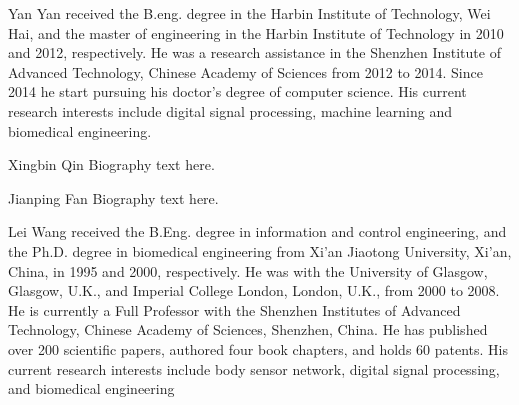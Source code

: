 \documentclass[journal]{IEEEtran}
\begin{document}
  
  

% 

\begin{IEEEbiography}{Yan Yan}
received the B.eng. degree in the Harbin Institute of Technology, Wei Hai, and the master of engineering in the Harbin Institute of Technology in 2010 and 2012, respectively. He was a research assistance in the Shenzhen Institute of Advanced Technology, Chinese Academy of Sciences from 2012 to 2014. Since 2014 he start pursuing his doctor's degree of computer science. His current research interests include digital signal processing, machine learning and biomedical engineering.
\end{IEEEbiography} 

\begin{IEEEbiography}{Xingbin Qin}
Biography text here.
\end{IEEEbiography}

\begin{IEEEbiography}{Jianping Fan}
Biography text here.
\end{IEEEbiography}
\begin{IEEEbiography}{Lei Wang}
received the B.Eng. degree in information and control engineering, and the Ph.D. degree in biomedical engineering from Xi’an Jiaotong University, Xi’an, China, in 1995 and 2000, respectively. He was with the University of Glasgow, Glasgow, U.K., and Imperial College London, London, U.K., from 2000 to 2008. He is currently a Full Professor with the Shenzhen Institutes of Advanced Technology, Chinese Academy of Sciences, Shenzhen, China. He has published over 200 scientific papers, authored four book chapters, and holds 60 patents. His current research interests include body sensor network, digital signal processing, and biomedical engineering
\end{IEEEbiography}
\end{document}
